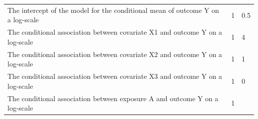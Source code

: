 \documentclass[10,a4paperpaper,]{article}
\begin{document}
\begin{longtable}[]{@{}lll@{}}
\begin{minipage}[t]{0.37\columnwidth}
The intercept of the model for the conditional mean of outcome Y on a
log-scale\strut
\end{minipage} & \begin{minipage}[t]{0.12\columnwidth}\raggedright
1\strut
\end{minipage} & \begin{minipage}[t]{0.43\columnwidth}\raggedright
0.5\strut
\end{minipage}\tabularnewline
\begin{minipage}[t]{0.37\columnwidth}\raggedright
The conditional association between covariate X1 and outcome Y on a
log-scale\strut
\end{minipage} & \begin{minipage}[t]{0.12\columnwidth}\raggedright
1\strut
\end{minipage} & \begin{minipage}[t]{0.43\columnwidth}\raggedright
4\strut
\end{minipage}\tabularnewline
\begin{minipage}[t]{0.37\columnwidth}\raggedright
The conditional association between covariate X2 and outcome Y on a
log-scale\strut
\end{minipage} & \begin{minipage}[t]{0.12\columnwidth}\raggedright
1\strut
\end{minipage} & \begin{minipage}[t]{0.43\columnwidth}\raggedright
1\strut
\end{minipage}\tabularnewline
\begin{minipage}[t]{0.37\columnwidth}\raggedright
The conditional association between covariate X3 and outcome Y on a
log-scale\strut
\end{minipage} & \begin{minipage}[t]{0.12\columnwidth}\raggedright
1\strut
\end{minipage} & \begin{minipage}[t]{0.43\columnwidth}\raggedright
0\strut
\end{minipage}\tabularnewline
\begin{minipage}[t]{0.37\columnwidth}\raggedright
The conditional association between exposure A and outcome Y on a
log-scale\strut
\end{minipage} & \begin{minipage}[t]{0.12\columnwidth}\raggedright
1\strut
\end{minipage} & \begin{minipage}[t]{0.43\columnwidth}\raggedright

\end{minipage}
\end{longtable}
\end{document}
